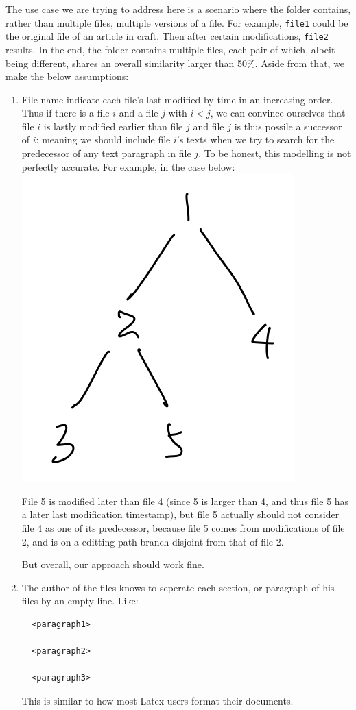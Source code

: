 \documentclass{article}
\begin{document}
The use case we are trying to address here is a scenario where the folder contains, rather than multiple files, multiple versions of a file. For example, \texttt{file1} could be the original file of an article in craft. Then after certain modifications, \texttt{file2} results. In the end, the folder contains multiple files, each pair of which, albeit being different, shares an overall similarity larger than 50\%. Aside from that, we make the below assumptions:
\begin{enumerate}
  \item File name indicate each file's last-modified-by time in an increasing order. Thus if there is a file $i$ and a file $j$ with $i<j$, we can convince ourselves that file $i$ is lastly modified earlier than file $j$ and file $j$ is thus possile a successor of $i$: meaning we should include file $i$'s texts when we try to search for the predecessor of any text paragraph in file $j$. To be honest, this modelling is not perfectly accurate. For example, in the case below:\\
  \includegraphics[scale=0.3,center]{pic1.png}

  File 5 is modified later than file 4 (since 5 is larger than 4, and thus file 5 has a later last modification timestamp), but file 5 actually should not consider file 4 as one of its predecessor, because file 5 comes from modifications of file 2, and is on a editting path branch disjoint from that of file 2. 

  But overall, our approach should work fine. 
  \item The author of the files knows to seperate each section, or paragraph of his files by an empty line. Like:
  \begin{lstlisting}
  <paragraph1>

  <paragraph2>

  <paragraph3>
  \end{lstlisting}
  This is similar to how most Latex users format their documents. 
\end{enumerate}
\end{document}
